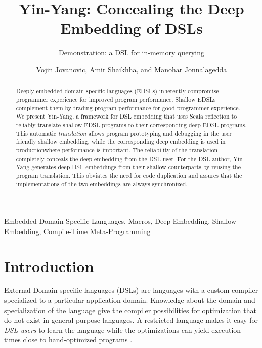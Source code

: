 \documentclass{llncs}
\begin{document}
\title{Yin-Yang: Concealing the Deep Embedding of DSLs}
\subtitle{Demonstration: a DSL for in-memory querying}

\author{Vojin Jovanovic, Amir Shaikhha, and Manohar Jonnalagedda}


\maketitle

\begin{abstract}
Deeply embedded domain-specific languages (EDSLs) inherently compromise programmer experience for improved program performance. Shallow EDSLs complement them by trading program performance for good programmer experience. We present Yin-Yang, a framework for DSL embedding that uses Scala reflection to reliably translate shallow EDSL programs to their corresponding deep EDSL programs. This automatic \emph{translation} allows program prototyping and debugging in the user friendly shallow embedding, while the corresponding deep embedding is used in production\textemdash where performance is important. The reliability of the translation completely conceals the deep embedding from the DSL user. For the DSL author, Yin-Yang generates deep DSL embeddings from their shallow counterparts by reusing the program translation. This obviates the need for code duplication and assures that the implementations of the two embeddings are always synchronized.
\end{abstract}

\keywords
Embedded Domain-Specific Languages, Macros, Deep Embedding, Shallow Embedding, Compile-Time Meta-Programming

\section{Introduction}

External Domain-specific languages (DSLs) are languages with a custom compiler specialized to a particular application domain. Knowledge about the domain and specialization of the language give the compiler possibilities for optimization that do not exist in general purpose languages. A restricted language makes it easy for \emph{DSL users} to learn the language while the optimizations can yield execution times close to hand-optimized programs \cite{rompf_optimizing_2013}.
\end{document}

